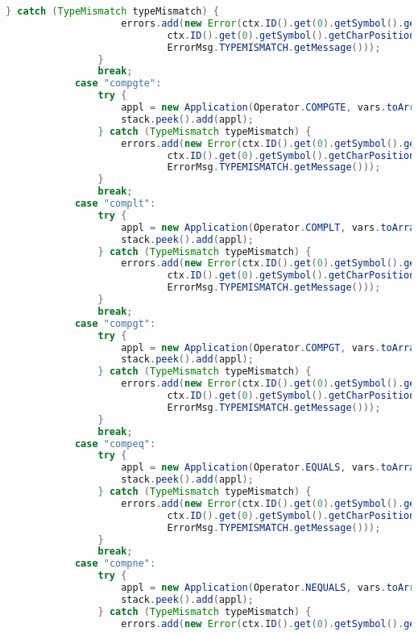 \begin{landscape}
\begin{lstlisting}[language=Java]
                } catch (TypeMismatch typeMismatch) {
                    errors.add(new Error(ctx.ID().get(0).getSymbol().getLine(),
                            ctx.ID().get(0).getSymbol().getCharPositionInLine(),
                            ErrorMsg.TYPEMISMATCH.getMessage()));
                }
                break;
            case "compgte":
                try {
                    appl = new Application(Operator.COMPGTE, vars.toArray(varArr));
                    stack.peek().add(appl);
                } catch (TypeMismatch typeMismatch) {
                    errors.add(new Error(ctx.ID().get(0).getSymbol().getLine(),
                            ctx.ID().get(0).getSymbol().getCharPositionInLine(),
                            ErrorMsg.TYPEMISMATCH.getMessage()));
                }
                break;
            case "complt":
                try {
                    appl = new Application(Operator.COMPLT, vars.toArray(varArr));
                    stack.peek().add(appl);
                } catch (TypeMismatch typeMismatch) {
                    errors.add(new Error(ctx.ID().get(0).getSymbol().getLine(),
                            ctx.ID().get(0).getSymbol().getCharPositionInLine(),
                            ErrorMsg.TYPEMISMATCH.getMessage()));
                }
                break;
            case "compgt":
                try {
                    appl = new Application(Operator.COMPGT, vars.toArray(varArr));
                    stack.peek().add(appl);
                } catch (TypeMismatch typeMismatch) {
                    errors.add(new Error(ctx.ID().get(0).getSymbol().getLine(),
                            ctx.ID().get(0).getSymbol().getCharPositionInLine(),
                            ErrorMsg.TYPEMISMATCH.getMessage()));
                }
                break;
            case "compeq":
                try {
                    appl = new Application(Operator.EQUALS, vars.toArray(varArr));
                    stack.peek().add(appl);
                } catch (TypeMismatch typeMismatch) {
                    errors.add(new Error(ctx.ID().get(0).getSymbol().getLine(),
                            ctx.ID().get(0).getSymbol().getCharPositionInLine(),
                            ErrorMsg.TYPEMISMATCH.getMessage()));
                }
                break;
            case "compne":
                try {
                    appl = new Application(Operator.NEQUALS, vars.toArray(varArr));
                    stack.peek().add(appl);
                } catch (TypeMismatch typeMismatch) {
                    errors.add(new Error(ctx.ID().get(0).getSymbol().getLine(),

\end{lstlisting}
\end{landscape}
